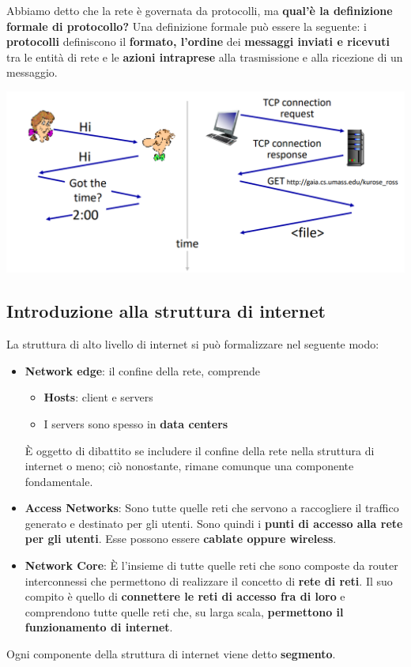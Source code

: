 \documentclass[12pt]{article}
\begin{document}
Abbiamo detto che la rete è governata da protocolli, ma \textbf{qual'è la definizione formale di protocollo?}
Una definizione formale può essere la seguente: i \textbf{protocolli} definiscono il \textbf{formato, l'ordine} dei \textbf{messaggi inviati e ricevuti} tra le entità di rete e le
\textbf{azioni intraprese} alla trasmissione e alla ricezione di un messaggio.
\begin{center}
    \includegraphics[width = 0.85\linewidth]{Images/3.PNG}
\end{center}
\subsection{Introduzione alla struttura di internet}
La struttura di alto livello di internet si può formalizzare nel seguente modo:
\begin{itemize}
    \item \textbf{Network edge}: il confine della rete, comprende
    \begin{itemize}
        \item \textbf{Hosts}: client e servers
        \item I servers sono spesso in \textbf{data centers}
    \end{itemize}
    È oggetto di dibattito se includere il confine della rete nella struttura di internet o meno; ciò nonostante, rimane comunque
    una componente fondamentale.
    \item \textbf{Access Networks}: Sono tutte quelle reti che servono a raccogliere il traffico generato e destinato per gli utenti.
    Sono quindi i \textbf{punti di accesso alla rete per gli utenti}. Esse possono essere \textbf{cablate oppure wireless}.
    \item \textbf{Network Core}: È l'insieme di tutte quelle reti che sono composte da router interconnessi che permettono di realizzare il concetto di \textbf{rete di reti}.
    Il suo compito è quello di \textbf{connettere le reti di accesso fra di loro} e comprendono tutte quelle reti che, su larga scala, \textbf{permettono il funzionamento di internet}.
\end{itemize}
Ogni componente della struttura di internet viene detto \textbf{segmento}.
\end{document}
